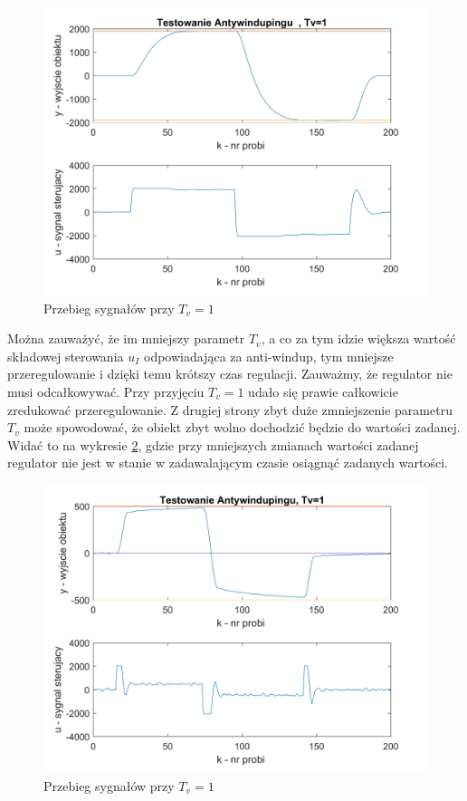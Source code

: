 \documentclass[a4paper, 10pt]{article}
\begin{document}
\begin{figure}[H]
	\centering
	\includegraphics[width=0.9\linewidth]{aw1}
	\caption{Przebieg sygnałów przy $T_{v}=1$}
	\label{fig:aw1}
\end{figure}
Można zauważyć, że im mniejszy parametr $T_{v}$, a co za tym idzie większa wartość składowej sterowania $u_{I}$ odpowiadająca za anti-windup, tym mniejsze przeregulowanie i dzięki temu krótszy czas regulacji. Zauważmy, że regulator nie musi odcałkowywać. Przy przyjęciu $T_{v}=1$ udało się prawie całkowicie zredukować przeregulowanie. 
Z drugiej strony zbyt duże zmniejszenie parametru $T_{v}$ może spowodować, że obiekt zbyt wolno dochodzić będzie do wartości zadanej. Widać to na wykresie \ref{fig:aw11}, gdzie przy mniejszych zmianach wartości zadanej regulator nie jest w stanie w zadawalającym czasie osiągnąć zadanych wartości.
\begin{figure}[H]
	\centering
	\includegraphics[width=0.9\linewidth]{aw11}
	\caption{Przebieg sygnałów przy $T_{v}=1$}
	\label{fig:aw11}
\end{figure}
\end{document}
